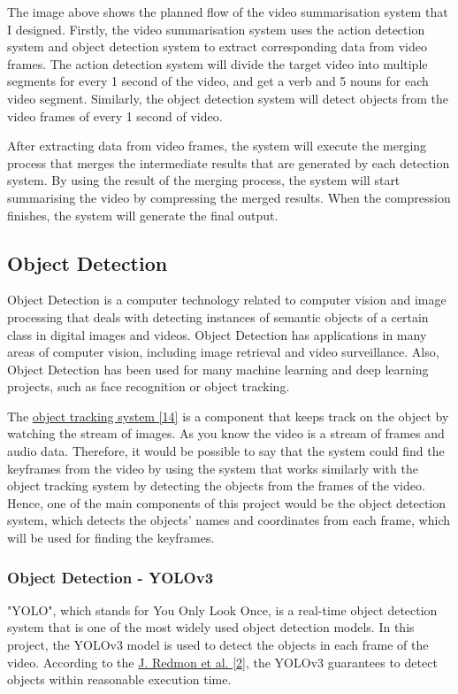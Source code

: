 \documentclass{article}
\begin{document}
The image above shows the planned flow of the video summarisation system that I designed. Firstly, the video summarisation system uses the action detection system and object detection system to extract corresponding data from video frames. The action detection system will divide the target video into multiple segments for every 1 second of the video, and get a verb and 5 nouns for each video segment. Similarly, the object detection system will detect objects from the video frames of every 1 second of video.

After extracting data from video frames, the system will execute the merging process that merges the intermediate results that are generated by each detection system. By using the result of the merging process, the system will start summarising the video by compressing the merged results. When the compression finishes, the system will generate the final output.

\subsection{Object Detection}

Object Detection is a computer technology related to computer vision and image processing that deals with detecting instances of semantic objects of a certain class in digital images and videos. Object Detection has applications in many areas of computer vision, including image retrieval and video surveillance. Also, Object Detection has been used for many machine learning and deep learning projects, such as face recognition or object tracking.

The \hyperlink{ref14}{object tracking system [14]} is a component that keeps track on the object by watching the stream of images. As you know the video is a stream of frames and audio data. Therefore, it would be possible to say that the system could find the keyframes from the video by using the system that works similarly with the object tracking system by detecting the objects from the frames of the video. Hence, one of the main components of this project would be the object detection system, which detects the objects' names and coordinates from each frame, which will be used for finding the keyframes.

\subsubsection{Object Detection - YOLOv3}

"YOLO", which stands for You Only Look Once, is a real-time object detection system that is one of the most widely used object detection models. In this project, the YOLOv3 model is used to detect the objects in each frame of the video. According to the \hyperlink{ref2}{J. Redmon et al. [2]}, the YOLOv3 guarantees to detect objects within reasonable execution time.
\end{document}

